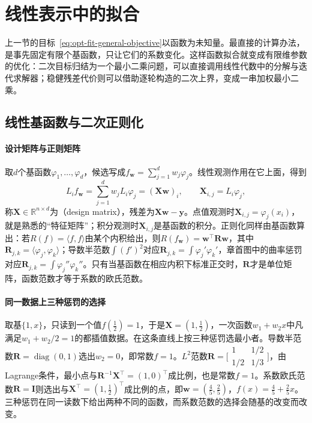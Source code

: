 \section{线性表示中的拟合}
\label{sec:opt-fit-linear}

上一节的目标~\eqref{eq:opt-fit-general-objective}以函数为未知量。最直接的计算办法，是事先固定有限个基函数，只让它们的系数变化。这样函数拟合就变成有限维参数的优化：二次目标归结为一个最小二乘问题，可以直接调用线性代数中的分解与迭代求解器；稳健残差代价则可以借助逐轮构造的二次上界，变成一串加权最小二乘。

\subsection{线性基函数与二次正则化}
\label{sec:opt-fit-linear-basis}

\paragraph{设计矩阵与正则矩阵}
取$d$个基函数$\varphi_1,\dots,\varphi_d$，候选写成$f_{\bm w}=\sum_{j=1}^dw_j\varphi_j$。线性观测作用在它上面，得到
\[
  L_if_{\bm w}=\sum_{j=1}^dw_jL_i\varphi_j=(\bm X\bm w)_i,\qquad \bm X_{i,j}=L_i\varphi_j,
\]
称$\bm X\in\mathbb R^{n\times d}$为（design matrix），残差为$\bm X\bm w-\bm y$。点值观测时$\bm X_{i,j}=\varphi_j(x_i)$，就是熟悉的“特征矩阵”；积分观测时$\bm X_{i,j}$是基函数的积分。正则化同样由基函数算出：若$R(f)=\langle f,f\rangle$由某个内积给出，则$R(f_{\bm w})=\bm w^\top\bm R\bm w$，其中$\bm R_{j,k}=\langle\varphi_j,\varphi_k\rangle$；导数半范数$\int(f')^2$对应$\bm R_{j,k}=\int\varphi_j'\varphi_k'$，章首图中的曲率惩罚对应$\bm R_{j,k}=\int\varphi_j''\varphi_k''$。只有当基函数在相应内积下标准正交时，$\bm R$才是单位矩阵，函数范数才等于系数的欧氏范数。

\paragraph{同一数据上三种惩罚的选择}
取基$\{1,x\}$，只读到一个值$f(\tfrac12)=1$，于是$\bm X=(1,\tfrac12)$，一次函数$w_1+w_2x$中凡满足$w_1+w_2/2=1$的都插值数据。在这条直线上按三种惩罚选最小者。导数半范数$\bm R=\operatorname{diag}(0,1)$选出$w_2=0$，即常数$f=1$。$L^2$范数$\bm R=\bigl[\begin{smallmatrix}1&1/2\\1/2&1/3\end{smallmatrix}\bigr]$，由Lagrange条件，最小点与$\bm R^{-1}\bm X^\top=(1,0)^\top$成比例，也是常数$f=1$。系数欧氏范数$\bm R=\bm I$则选出与$\bm X^\top=(1,\tfrac12)^\top$成比例的点，即$\bm w=(\tfrac45,\tfrac25)$，$f(x)=\tfrac45+\tfrac25x$。三种惩罚在同一读数下给出两种不同的函数，而系数范数的选择会随基的改变而改变。

